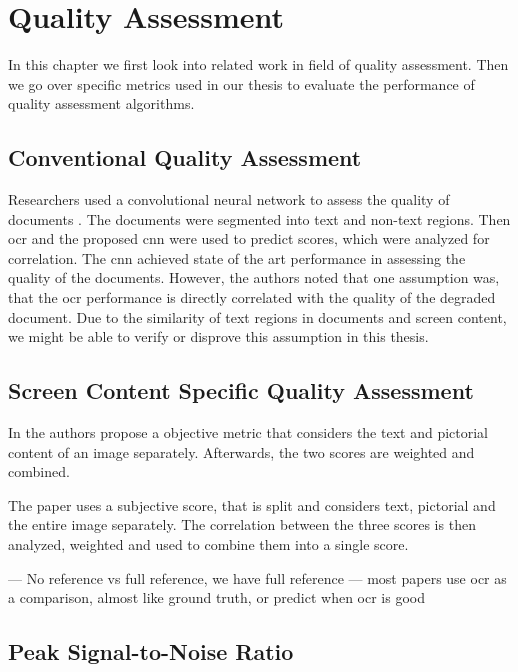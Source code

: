 \chapter{Quality Assessment}
\label{chap:qualityassessment}

In this chapter we first look into related work in field of quality assessment.
Then we go over specific metrics used in our thesis to evaluate the performance of quality assessment algorithms.

\section{Conventional Quality Assessment}

Researchers used a convolutional neural network to assess the quality of documents \cite{ocr_cnn_docu_2014}.
The documents were segmented into text and non-text regions.
Then \gls{ocr} and the proposed \gls{cnn} were used to predict scores, which were analyzed for correlation.
The \gls{cnn} achieved state of the art performance in assessing the quality of the documents.
However, the authors noted that one assumption was, that the \gls{ocr} performance is directly correlated with the quality of the degraded document.
Due to the similarity of text regions in documents and screen content, we might be able to verify or disprove this assumption in this thesis.

\section{Screen Content Specific Quality Assessment}

In \cite{text_pict_weight_2017} the authors propose a objective metric that considers the text and pictorial content of an image separately.
Afterwards, the two scores are weighted and combined.

The paper \cite{3_subj_weight_2015} uses a subjective score, that is split and considers text, pictorial and the entire image separately.
The correlation between the three scores is then analyzed, weighted and used to combine them into a single score.

--- No reference vs full reference, we have full reference
--- most papers use ocr as a comparison, almost like ground truth, or predict when ocr is good


\section{Peak Signal-to-Noise Ratio}
\label{subsec:psnr}


